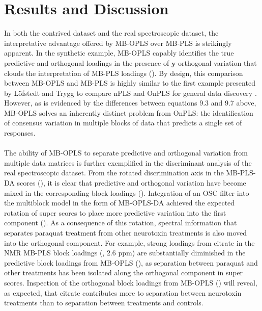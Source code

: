 \section{Results and Discussion}

\begin{doublespace}
In both the contrived dataset and the real spectroscopic dataset, the
interpretative advantage offered by MB-OPLS over MB-PLS is strikingly
apparent. In the synthetic example, MB-OPLS capably identifies the true
predictive and orthogonal loadings in the presence of $\mathbf{y}$-orthogonal
variation that clouds the interpretation of MB-PLS loadings
(). By design, this comparison between
MB-OPLS and MB-PLS is highly similar to the first example
presented by L\"{o}fstedt and Trygg to compare nPLS and OnPLS
for general data discovery \cite{lofstedt:jchemo2011}. However, as is
evidenced by the differences between equations 9.3 and 9.7 above, MB-OPLS
solves an inherently distinct problem from OnPLS: the identification of
consensus variation in multiple blocks of data that predicts a single set
of responses.
\\\\
The ability of MB-OPLS to separate predictive and orthogonal variation from
multiple data matrices is further exemplified in the discriminant analysis
of the real spectroscopic dataset. From the rotated discrimination axis in
the MB-PLS-DA scores (), it is clear that predictive
and orthogonal variation have become mixed in the corresponding block loadings
(). Integration of an OSC filter into the multiblock
model in the form of MB-OPLS-DA achieved the expected rotation of super scores
to place more predictive variation into the first component
(). As a consequence of this rotation, spectral
information that separates paraquat treatment from other neurotoxin treatments
is also moved into the orthogonal component. For example, strong loadings from
citrate in the \hnmr{} NMR MB-PLS block loadings
(, 2.6 ppm) are substantially diminished
in the predictive block loadings from MB-OPLS
(), as separation between paraquat and
other treatments has been isolated along the orthogonal component in super
scores. Inspection of the orthogonal block loadings from MB-OPLS
() will reveal, as expected, that citrate
contributes more to separation between neurotoxin treatments than to
separation between treatments and controls.
\\\\

\end{doublespace}
